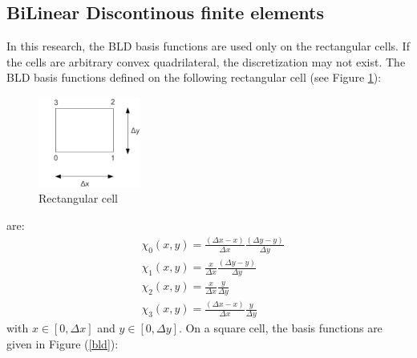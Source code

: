\subsection{BiLinear Discontinous finite elements}
In this research, the BLD basis functions are used only on the rectangular
cells. If the cells are arbitrary convex quadrilateral, the discretization may
not exist. The BLD basis functions defined on the following rectangular cell
(see Figure \ref{fig_cell}):
\begin{figure}[H]
  \centering
  \includegraphics[width=0.3\textwidth]{./Spatial_discretizations/cell}
  \caption{Rectangular cell}
  \label{fig_cell}
\end{figure}
are:
\begin{align}
  &\chi_0(x,y) = \frac{(\Delta x-x)}{\Delta x}\frac{(\Delta y-y)}{\Delta y}\\
  &\chi_1(x,y) = \frac{x}{\Delta x}\frac{(\Delta y-y)}{\Delta y}\\
  &\chi_2(x,y) = \frac{x}{\Delta x}\frac{y}{\Delta y}\\
  &\chi_3(x,y) = \frac{(\Delta x-x)}{\Delta x}\frac{y}{\Delta y}
\end{align}
with $x\in[0,\Delta x]$ and $y\in[0,\Delta y]$. On a square cell, the basis 
functions are given in Figure (\ref{bld}):

